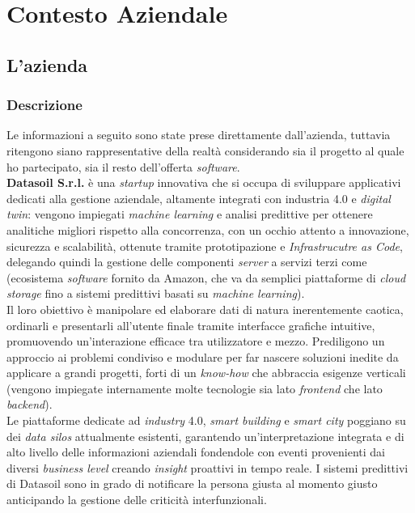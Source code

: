 
\chapter{Contesto Aziendale}
\label{cap:contesto-aziendale}

\section{L'azienda}
\subsection{Descrizione}
Le informazioni a seguito sono state prese direttamente dall'azienda, tuttavia ritengono siano rappresentative della realtà considerando sia il progetto al quale ho partecipato, sia il resto dell'offerta \textit{software}.\\
\textbf{Datasoil S.r.l.} è una \textit{startup} innovativa che si occupa di sviluppare applicativi dedicati alla gestione aziendale, altamente integrati con industria 4.0 e \textit{digital twin}: vengono impiegati \textit{machine learning} e analisi predittive per ottenere analitiche migliori rispetto alla concorrenza, con un occhio attento a innovazione, sicurezza e scalabilità, ottenute tramite prototipazione e \textit{Infrastrucutre as Code}, delegando quindi la gestione delle componenti \textit{server} a servizi terzi come \aws{} (ecosistema \textit{software} fornito da Amazon, che va da semplici piattaforme di \textit{cloud storage} fino a sistemi predittivi basati su \textit{machine learning}).\\
Il loro obiettivo è manipolare ed elaborare dati di natura inerentemente caotica, ordinarli e presentarli all'utente finale tramite interfacce grafiche intuitive, promuovendo un'interazione efficace tra utilizzatore e mezzo. Prediligono un approccio ai problemi condiviso e modulare per far nascere soluzioni inedite da applicare a grandi progetti, forti di un \textit{know-how} che abbraccia esigenze verticali (vengono impiegate internamente molte tecnologie sia lato \textit{frontend} che lato \textit{backend}).\\
Le piattaforme dedicate ad \textit{industry} 4.0, \textit{smart building} e \textit{smart city} poggiano su dei \textit{data silos} attualmente esistenti, garantendo un'interpretazione integrata e di alto livello delle informazioni aziendali fondendole con eventi provenienti dai diversi \textit{business level} creando \textit{insight} proattivi in tempo reale. I sistemi predittivi di Datasoil sono in grado di notificare la persona giusta al momento giusto anticipando la gestione delle criticità interfunzionali.\\
